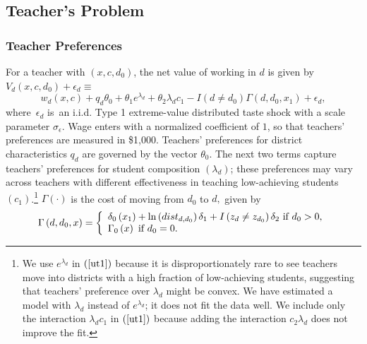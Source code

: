 \documentclass[notitlepage,12pt]{article}%
\begin{document}
\subsection{Teacher's Problem}

\subsubsection{Teacher Preferences}

For a teacher with $\left(  x,c,d_{0}\right)  $, the net value of working in
$d$ is given by\newline$V_{d}\left(  x,c,d_{0}\right)  +\epsilon_{d}\equiv$%
\begin{equation}
w_{d}\left(  x,c\right)  +q_{d}\theta_{0}+\theta_{1}e^{\lambda_{d}}+\theta
_{2}\lambda_{d}c_{1}-I\left(  d\neq d_{0}\right)  \Gamma\left(  d,d_{0}%
,x_{1}\right)  +\epsilon_{d}, \label{ut1}%
\end{equation}
where\ $\epsilon_{d}$ is\ an i.i.d. Type 1 extreme-value distributed taste
shock with a scale parameter $\sigma_{\epsilon}.$ Wage enters with a
normalized coefficient of $1$, so that teachers' preferences are measured in
\$1,000. Teachers' preferences for district characteristics $q_{d}$ are
governed by the vector $\theta_{0}$. The next two terms capture teachers'
preferences for student composition $\left(  \lambda_{d}\right)  $; these
preferences may vary across teachers with different effectiveness in teaching
low-achieving students $\left(  c_{1}\right)  $.\footnote{We use
$e^{\lambda_{d}}$ in $\left(  \ref{ut1}\right)  $ because it is
disproportionately rare to see teachers move into districts with a high
fraction of low-achieving students, suggesting that teachers' preference over
$\lambda_{d}$ might be convex. We have estimated a model with $\lambda_{d}$
instead of $e^{\lambda_{d}}$; it does not fit the data well. We include only
the interaction $\lambda_{d}c_{1}$ in $\left(  \ref{ut1}\right)  $ because
adding the interaction $c_{2}\lambda_{d}$ does not improve the fit.}
$\Gamma\left(  \cdot\right)  $ is the cost of moving from $d_{0}$ to $d,$
given by
\begin{equation}
\Gamma\left(  d,d_{0},x\right)  =\left\{
\begin{array}
[c]{l}%
\delta_{0}\left(  x_{1}\right)  +\ln\left(  dist_{d,d_{0}}\right)  \delta
_{1}+I\left(  z_{d}\neq z_{d_{0}}\right)  \delta_{2}\text{ if }d_{0}%
>0\text{,}\\
\Gamma_{0}\left(  x\right)  \text{ if }d_{0}=0.
\end{array}
\right.  \label{ut2}%
\end{equation}
\end{document}
